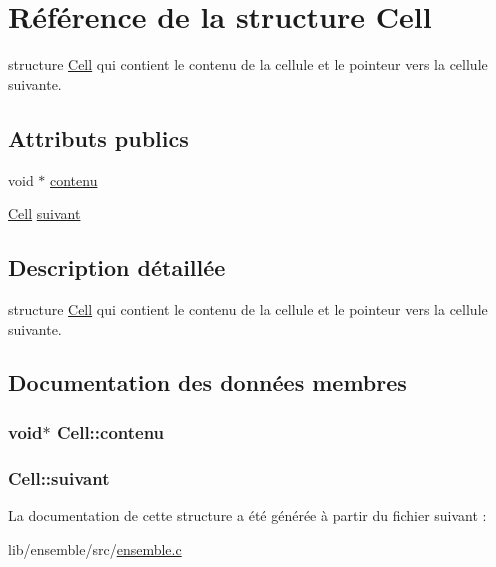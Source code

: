 \hypertarget{structCell}{\section{\-Référence de la structure \-Cell}
\label{structCell}
}


structure \hyperlink{structCell}{\-Cell} qui contient le contenu de la cellule et le pointeur vers la cellule suivante.  


\subsection*{\-Attributs publics}
\begin{DoxyCompactItemize}
\item 
void $\ast$ \hyperlink{structCell_af2d81fa8eccad6f58d37802fc1908a61}{contenu}
\item 
\hyperlink{structCell}{\-Cell} \hyperlink{structCell_ae4461332573d5a07e647627ecfdaa33e}{suivant}
\end{DoxyCompactItemize}


\subsection{\-Description détaillée}
structure \hyperlink{structCell}{\-Cell} qui contient le contenu de la cellule et le pointeur vers la cellule suivante. 

\subsection{\-Documentation des données membres}
\hypertarget{structCell_af2d81fa8eccad6f58d37802fc1908a61}{
\subsubsection[{contenu}]{\setlength{\rightskip}{0pt plus 5cm}void$\ast$ {\bf \-Cell\-::contenu}}}\label{structCell_af2d81fa8eccad6f58d37802fc1908a61}
\hypertarget{structCell_ae4461332573d5a07e647627ecfdaa33e}{
\subsubsection[{suivant}]{ {\bf \-Cell\-::suivant}}}\label{structCell_ae4461332573d5a07e647627ecfdaa33e}


\-La documentation de cette structure a été générée à partir du fichier suivant \-:\begin{DoxyCompactItemize}
\item 
lib/ensemble/src/\hyperlink{ensemble_8c}{ensemble.\-c}\end{DoxyCompactItemize}
